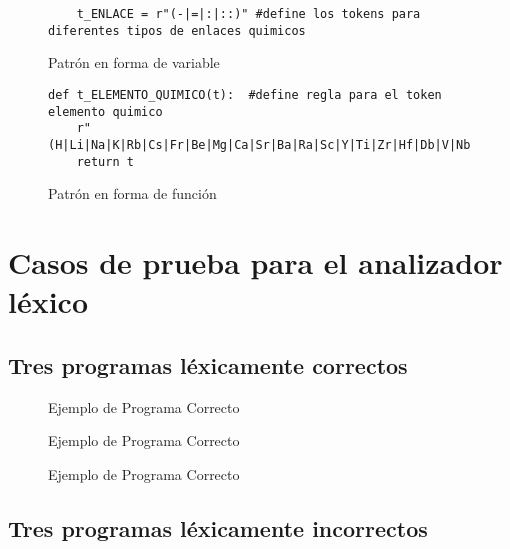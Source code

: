 \begin{figure}[H]
\begin{verbatim}
    t_ENLACE = r"(-|=|:|::)" #define los tokens para diferentes tipos de enlaces quimicos
\end{verbatim}
    \caption{Patrón en forma de variable}
    \label{fig: patronVariable}
\end{figure}

\begin{figure}[H]
    \begin{verbatim}
def t_ELEMENTO_QUIMICO(t):  #define regla para el token elemento quimico 
    r"(H|Li|Na|K|Rb|Cs|Fr|Be|Mg|Ca|Sr|Ba|Ra|Sc|Y|Ti|Zr|Hf|Db|V|Nb|Ta|Ji|Cr|Mo|W|Rf|Mn|Tc|Re|Bh|Fe|Ru|Os|Hn|Co|Rh|Ir|Mt|Ni|Pd|Pt|Cu|Ag|Au|Zn|Cd|Hg|B|Al|Ga|In|Ti|C|Si|Ge|Sn|Pb|N|P|As|Sb|Bi|O|S|Se|Te|Po|F|Cr|Br|I|At|He|Ne|Ar|Kr|Xe|Rn)"
    return t
\end{verbatim}
    \caption{Patrón en forma de función}
    \label{fig: patronFuncion}
\end{figure}

\newpage

\section{Casos de prueba para el analizador léxico}
\label{sec:lexerTest}

\subsection{Tres programas léxicamente correctos}
\label{subsec: lexerCorr}
\begin{figure}[H]
    \caption{Ejemplo de Programa Correcto}
    \label{fig: lexcorr1}
\end{figure}

\begin{figure}[H]
    \caption{Ejemplo de Programa Correcto}
    \label{fig: lexcorr2}
\end{figure}

\begin{figure}[H]
    \caption{Ejemplo de Programa Correcto}
    \label{fig: lexcorr3}
\end{figure}

\newpage
\subsection{Tres programas léxicamente incorrectos}

